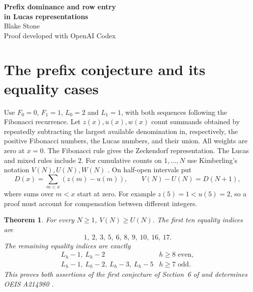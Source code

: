 \documentclass[10pt]{article}
\newtheorem{theorem}{Theorem}[section]
\begin{document}
\begin{center}
{\LARGE\bfseries Prefix dominance and row entry\\[2pt] in Lucas representations}\\[7pt]
Blake Stone\\[-1pt]{\small Proof developed with OpenAI Codex}
\end{center}
\begin{abstract}
For every $N$, the Fibonacci representations of $1,\ldots,N$ use at least as many summands as their greedy Lucas representations. We prove Kimberling's prefix conjecture and classify every equality index. We determine the first adjacent Wythoff pair and the beginning of the permanent Wythoff tail in each row of both Lucas--Wythoff arrays. For the mixed Fibonacci--Lucas basis we give a joint generating function, a nondegenerate bivariate central limit theorem, and an alternate proof of the known limiting ratio $(5-\sqrt5)/2$.
\end{abstract}

\section{The prefix conjecture and its equality cases}
Use $F_0=0$, $F_1=1$, $L_0=2$ and $L_1=1$, with both sequences following the Fibonacci recurrence. Let $z(x),u(x),w(x)$ count summands obtained by repeatedly subtracting the largest available denomination in, respectively, the positive Fibonacci numbers, the Lucas numbers, and their union. All weights are zero at $x=0$. The Fibonacci rule gives the Zeckendorf representation. The Lucas and mixed rules include $2$. For cumulative counts on $1,\ldots,N$ use Kimberling's notation $V(N),U(N),W(N)$ \cite{kim}. On half-open intervals put
\[
 D(x)=\sum_{m<x}(z(m)-u(m)),\qquad V(N)-U(N)=D(N+1),
\]
where sums over $m<x$ start at zero. For example $z(5)=1<u(5)=2$, so a proof must account for compensation between different integers.

\begin{theorem}\label{main}
For every $N\ge1$, $V(N)\ge U(N)$. The first ten equality indices are\[1,\ 2,\ 3,\ 5,\ 6,\ 8,\ 9,\ 10,\ 16,\ 17.\] The remaining equality indices are exactly
\[
\begin{array}{ll}
 L_h-1,\ L_h-2 & h\ge8 \text{ even},\\
 L_h-1,\ L_h-2,\ L_h-3,\ L_h-5 & h\ge7 \text{ odd}.
\end{array}
\]
This proves both assertions of the first conjecture of Section~6 of \cite{kim} and determines OEIS A214980 \cite{sequences}.
\end{theorem}
\end{document}
